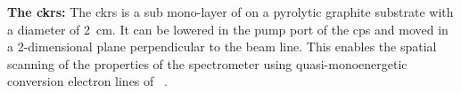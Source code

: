 {\par\textbf{The \gls{ckrs}:} The \gls{ckrs} is a sub mono-layer of \kryptonEightyThree{} on a pyrolytic graphite substrate with a diameter of \SI{2}{cm}. It can be lowered in the pump port of the \gls{cps} and moved in a 2-dimensional plane perpendicular to the beam line. This enables the spatial scanning of the properties of the spectrometer using quasi-monoenergetic conversion electron lines of \kryptonEightyThree~\cite{Bauer2014, Dyba2019, Arenz2018Kr}.}
